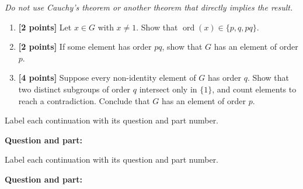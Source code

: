\documentclass[11pt,letterpaper]{article}
\begin{document}
\textit{Do not use Cauchy's theorem or another theorem that directly implies the result.}
\begin{enumerate}[label=(\alph*)]
\item \textbf{[2 points]} Let $x\in G$ with $x\neq 1$. Show that $\operatorname{ord}(x)\in\{p,q,pq\}$.
\par\vspace*{1.5in}
\item \textbf{[2 points]} If some element has order $pq$, show that $G$ has an element of order $p$.
\par\vspace*{1.3in}
\item \textbf{[4 points]} Suppose every non-identity element of $G$ has order $q$. Show that two distinct subgroups of order $q$ intersect only in $\{1\}$, and count elements to reach a contradiction. Conclude that $G$ has an element of order $p$.
\end{enumerate}
\vfill
\newpage

\par\medskip
Label each continuation with its question and part number.\par\medskip
\textbf{Question and part:}\ \hrulefill
\vfill
\newpage

\par\medskip
Label each continuation with its question and part number.\par\medskip
\textbf{Question and part:}\ \hrulefill
\vfill
\end{document}
